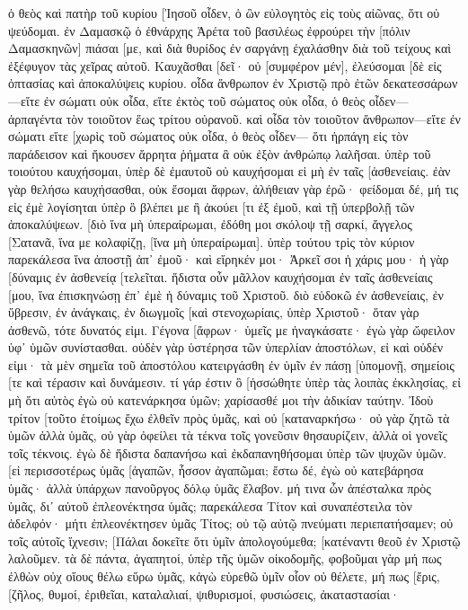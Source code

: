ὁ θεὸς καὶ πατὴρ τοῦ κυρίου [Ἰησοῦ οἶδεν, ὁ ὢν εὐλογητὸς εἰς τοὺς αἰῶνας, ὅτι οὐ ψεύδομαι. 
ἐν Δαμασκῷ ὁ ἐθνάρχης Ἁρέτα τοῦ βασιλέως ἐφρούρει τὴν [πόλιν Δαμασκηνῶν] πιάσαι [με, 
καὶ διὰ θυρίδος ἐν σαργάνῃ ἐχαλάσθην διὰ τοῦ τείχους καὶ ἐξέφυγον τὰς χεῖρας αὐτοῦ. 
Καυχᾶσθαι [δεῖ· οὐ [συμφέρον μέν], ἐλεύσομαι [δὲ εἰς ὀπτασίας καὶ ἀποκαλύψεις κυρίου. 
οἶδα ἄνθρωπον ἐν Χριστῷ πρὸ ἐτῶν δεκατεσσάρων—εἴτε ἐν σώματι οὐκ οἶδα, εἴτε ἐκτὸς τοῦ σώματος οὐκ οἶδα, ὁ θεὸς οἶδεν—ἁρπαγέντα τὸν τοιοῦτον ἕως τρίτου οὐρανοῦ. 
καὶ οἶδα τὸν τοιοῦτον ἄνθρωπον—εἴτε ἐν σώματι εἴτε [χωρὶς τοῦ σώματος οὐκ οἶδα, ὁ θεὸς οἶδεν— 
ὅτι ἡρπάγη εἰς τὸν παράδεισον καὶ ἤκουσεν ἄρρητα ῥήματα ἃ οὐκ ἐξὸν ἀνθρώπῳ λαλῆσαι. 
ὑπὲρ τοῦ τοιούτου καυχήσομαι, ὑπὲρ δὲ ἐμαυτοῦ οὐ καυχήσομαι εἰ μὴ ἐν ταῖς [ἀσθενείαις. 
ἐὰν γὰρ θελήσω καυχήσασθαι, οὐκ ἔσομαι ἄφρων, ἀλήθειαν γὰρ ἐρῶ· φείδομαι δέ, μή τις εἰς ἐμὲ λογίσηται ὑπὲρ ὃ βλέπει με ἢ ἀκούει [τι ἐξ ἐμοῦ, 
καὶ τῇ ὑπερβολῇ τῶν ἀποκαλύψεων. [διὸ ἵνα μὴ ὑπεραίρωμαι, ἐδόθη μοι σκόλοψ τῇ σαρκί, ἄγγελος [Σατανᾶ, ἵνα με κολαφίζῃ, [ἵνα μὴ ὑπεραίρωμαι]. 
ὑπὲρ τούτου τρὶς τὸν κύριον παρεκάλεσα ἵνα ἀποστῇ ἀπ᾽ ἐμοῦ· 
καὶ εἴρηκέν μοι· Ἀρκεῖ σοι ἡ χάρις μου· ἡ γὰρ [δύναμις ἐν ἀσθενείᾳ [τελεῖται. ἥδιστα οὖν μᾶλλον καυχήσομαι ἐν ταῖς ἀσθενείαις [μου, ἵνα ἐπισκηνώσῃ ἐπ᾽ ἐμὲ ἡ δύναμις τοῦ Χριστοῦ. 
διὸ εὐδοκῶ ἐν ἀσθενείαις, ἐν ὕβρεσιν, ἐν ἀνάγκαις, ἐν διωγμοῖς [καὶ στενοχωρίαις, ὑπὲρ Χριστοῦ· ὅταν γὰρ ἀσθενῶ, τότε δυνατός εἰμι. 
Γέγονα [ἄφρων· ὑμεῖς με ἠναγκάσατε· ἐγὼ γὰρ ὤφειλον ὑφ᾽ ὑμῶν συνίστασθαι. οὐδὲν γὰρ ὑστέρησα τῶν ὑπερλίαν ἀποστόλων, εἰ καὶ οὐδέν εἰμι· 
τὰ μὲν σημεῖα τοῦ ἀποστόλου κατειργάσθη ἐν ὑμῖν ἐν πάσῃ [ὑπομονῇ, σημείοις [τε καὶ τέρασιν καὶ δυνάμεσιν. 
τί γάρ ἐστιν ὃ [ἡσσώθητε ὑπὲρ τὰς λοιπὰς ἐκκλησίας, εἰ μὴ ὅτι αὐτὸς ἐγὼ οὐ κατενάρκησα ὑμῶν; χαρίσασθέ μοι τὴν ἀδικίαν ταύτην. 
Ἰδοὺ τρίτον [τοῦτο ἑτοίμως ἔχω ἐλθεῖν πρὸς ὑμᾶς, καὶ οὐ [καταναρκήσω· οὐ γὰρ ζητῶ τὰ ὑμῶν ἀλλὰ ὑμᾶς, οὐ γὰρ ὀφείλει τὰ τέκνα τοῖς γονεῦσιν θησαυρίζειν, ἀλλὰ οἱ γονεῖς τοῖς τέκνοις. 
ἐγὼ δὲ ἥδιστα δαπανήσω καὶ ἐκδαπανηθήσομαι ὑπὲρ τῶν ψυχῶν ὑμῶν. [εἰ περισσοτέρως ὑμᾶς [ἀγαπῶν, ἧσσον ἀγαπῶμαι; 
ἔστω δέ, ἐγὼ οὐ κατεβάρησα ὑμᾶς· ἀλλὰ ὑπάρχων πανοῦργος δόλῳ ὑμᾶς ἔλαβον. 
μή τινα ὧν ἀπέσταλκα πρὸς ὑμᾶς, δι᾽ αὐτοῦ ἐπλεονέκτησα ὑμᾶς; 
παρεκάλεσα Τίτον καὶ συναπέστειλα τὸν ἀδελφόν· μήτι ἐπλεονέκτησεν ὑμᾶς Τίτος; οὐ τῷ αὐτῷ πνεύματι περιεπατήσαμεν; οὐ τοῖς αὐτοῖς ἴχνεσιν; 
[Πάλαι δοκεῖτε ὅτι ὑμῖν ἀπολογούμεθα; [κατέναντι θεοῦ ἐν Χριστῷ λαλοῦμεν. τὰ δὲ πάντα, ἀγαπητοί, ὑπὲρ τῆς ὑμῶν οἰκοδομῆς, 
φοβοῦμαι γὰρ μή πως ἐλθὼν οὐχ οἵους θέλω εὕρω ὑμᾶς, κἀγὼ εὑρεθῶ ὑμῖν οἷον οὐ θέλετε, μή πως [ἔρις, [ζῆλος, θυμοί, ἐριθεῖαι, καταλαλιαί, ψιθυρισμοί, φυσιώσεις, ἀκαταστασίαι· 
